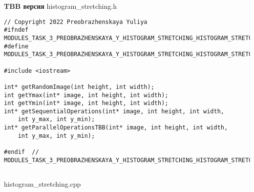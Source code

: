 \documentclass{report}
\begin{document}
\textbf{TBB версия}
\newline
\newline histogram\_stretching.h
\begin{lstlisting}
// Copyright 2022 Preobrazhenskaya Yuliya
#ifndef MODULES_TASK_3_PREOBRAZHENSKAYA_Y_HISTOGRAM_STRETCHING_HISTOGRAM_STRETCHING_H_
#define MODULES_TASK_3_PREOBRAZHENSKAYA_Y_HISTOGRAM_STRETCHING_HISTOGRAM_STRETCHING_H_

#include <iostream>

int* getRandomImage(int height, int width);
int getYmax(int* image, int height, int width);
int getYmin(int* image, int height, int width);
int* getSequentialOperations(int* image, int height, int width,
    int y_max, int y_min);
int* getParallelOperationsTBB(int* image, int height, int width,
    int y_max, int y_min);

#endif  // MODULES_TASK_3_PREOBRAZHENSKAYA_Y_HISTOGRAM_STRETCHING_HISTOGRAM_STRETCHING_H_


\end{lstlisting}
histogram\_stretching.cpp
\end{document}
